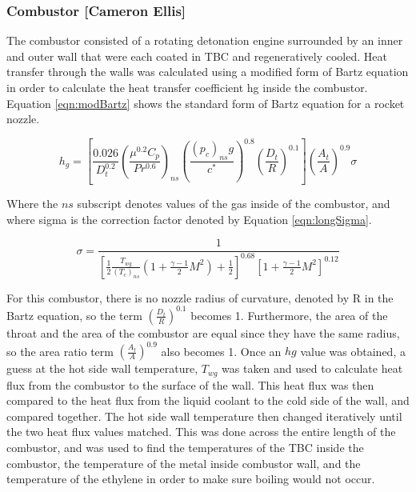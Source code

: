 \subsubsection{Combustor [Cameron Ellis]}

The combustor consisted of a rotating detonation engine surrounded by an inner and outer wall that were each coated in TBC and regeneratively cooled. Heat transfer through the walls was calculated using a modified form of Bartz equation in order to calculate the heat transfer coefficient hg inside the combustor. Equation \ref{eqn:modBartz} shows the standard form of Bartz equation for a rocket nozzle.

\begin{equation}
h_g = \left[ \frac{0.026}{D_t^{0.2}}\left(\frac{\mu^{0.2}C_p}{Pr^{0.6}}\right)_{ns} \left( \frac{(p_c)_{ns}g}{c^*} \right)^{0.8} \left(\frac{D_t}{R}\right)^{0.1} \right] \left(\frac{A_t}{A}\right)^{0.9}\sigma
\label{eqn:modBartz}
\end{equation}

Where the $ns$ subscript denotes values of the gas inside of the combustor, and where sigma is the correction factor denoted by Equation \ref{eqn:longSigma}.

\begin{equation}
\sigma=\frac{1}{\left[ \frac{1}{2} \frac{T_{wg}}{(T_c)_{ns}} \left( 1 + \frac{\gamma - 1}{2}M^2\right)+\frac{1}{2}\right]^{0.68} \left[1+\frac{\gamma-1}{2}M^2\right]^{0.12}}
\label{eqn:longSigma}
\end{equation}

For this combustor, there is no nozzle radius of curvature, denoted by R in the Bartz equation, so the term $\left(\frac{D_t}{R}\right)^{0.1}$ becomes 1. Furthermore, the area of the throat and the area of the combustor are equal since they have the same radius, so the area ratio term $\left(\frac{A_t}{A}\right)^{0.9}$ also becomes 1. Once an $hg$ value was obtained, a guess at the hot side wall temperature, $T_{wg}$ was taken and used to calculate heat flux from the combustor to the surface of the wall. This heat flux was then compared to the heat flux from the liquid coolant to the cold side of the wall, and compared together. The hot side wall temperature then changed iteratively until the two heat flux values matched. This was done across the entire length of the combustor, and was used to find the temperatures of the TBC inside the combustor, the temperature of the metal inside combustor wall, and the temperature of the ethylene in order to make sure boiling would not occur.

